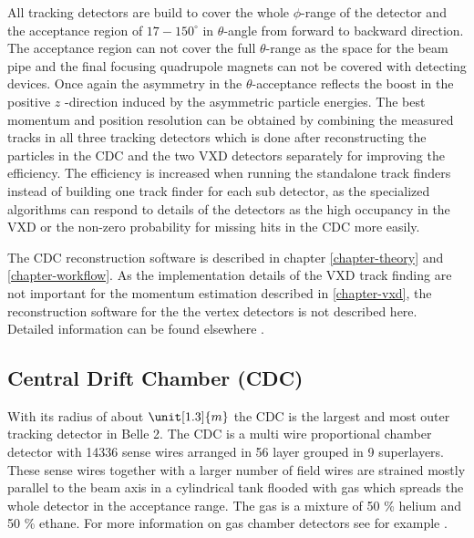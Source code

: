 All tracking detectors are build to cover the whole $\phi$-range of the detector and the acceptance region of $17-150 ^\circ$ in $\theta$-angle from forward to backward direction. The acceptance region can not cover the full $\theta$-range as the space for the beam pipe and the final focusing quadrupole magnets can not be covered with detecting devices. Once again the asymmetry in the $\theta$-acceptance reflects the boost in the positive $z$ -direction induced by the asymmetric particle energies. The best momentum and position resolution can be obtained by combining the measured tracks in all three tracking detectors which is done after reconstructing the particles in the CDC and the two VXD detectors separately for improving the efficiency. The efficiency is increased when running the standalone track finders instead of building one track finder for each sub detector, as the specialized algorithms can respond to details of the detectors as the high occupancy in the VXD or the non-zero probability for missing hits in the CDC more easily. 

The CDC reconstruction software is described in chapter \ref{chapter-theory} and \ref{chapter-workflow}. As the implementation details of the VXD track finding are not important for the momentum estimation described in \ref{chapter-vxd}, the reconstruction software for the the vertex detectors is not described here. Detailed information can be found elsewhere \cite{jakob}.

\subsection{Central Drift Chamber (CDC)}

With its radius of about $\unit[1.3]{m}$ the CDC is the largest and most outer tracking detector in Belle 2. The CDC is a multi wire proportional chamber detector with 14336 sense wires arranged in 56 layer grouped in 9 superlayers. These sense wires together with a larger number of field wires are strained mostly parallel to the beam axis in a cylindrical tank flooded with gas which spreads the whole detector in the acceptance range. The gas is a mixture of 50 \% helium and 50 \% ethane. For more information on gas chamber detectors see for example \cite{grupen}.

